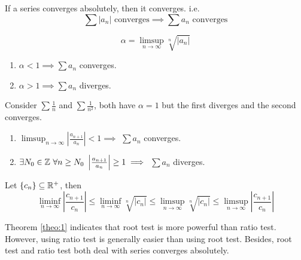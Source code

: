     \begin{theo}
        If a series converges absolutely, then it converges. i.e.
        \begin{equation}
            \sum |a_n| \text{ converges} \implies \sum a_n \text{ converges}
        \end{equation}
    \end{theo}

    \begin{theo}
        \begin{equation}
            \alpha = \limsup_{n \to \infty} \sqrt[n]{|a_n|}
        \end{equation}
        \begin{enumerate}
            \item $\alpha < 1 \implies \sum a_n$ converges.
            \item $\alpha > 1 \implies \sum a_n$ diverges.
        \end{enumerate}
    \end{theo}

    Consider $\sum \frac{1}{n}$ and $\sum \frac{1}{n^2}$, both have $\alpha=1$ but the first diverges and the second converges.

    \begin{theo} 
        \begin{enumerate}
            \item $\limsup_{n \to \infty} \left| \frac{a_{n+1}}{a_n} \right| < 1 \implies$ $\sum a_n$ converges.
            \item $\exists N_0 \in \mathbb{Z} \ \forall n \geq N_0 \ \left| \frac{a_{n+1}}{a_n} \right| \geq 1 \implies$ $\sum a_n$ diverges.
        \end{enumerate}
    \end{theo}

    \begin{theo} \label{theo:1}
        Let $\{c_n\} \subseteq \mathbb{R}^+$, then
        \begin{equation}
            \liminf_{n \to \infty} \left|\frac{c_{n+1}}{c_n}\right| \leq \liminf_{n \to \infty} \sqrt[n]{|c_n|} \leq \limsup_{n \to \infty} \sqrt[n]{|c_n|} \leq \limsup_{n \to \infty} \left|\frac{c_{n+1}}{c_n}\right|
        \end{equation}
    \end{theo}

    \begin{rem}
        Theorem \ref{theo:1} indicates that root test is more powerful than ratio test. However, using ratio test is generally easier than using root test. Besides, root test and ratio test both deal with series converges absolutely.
    \end{rem}

